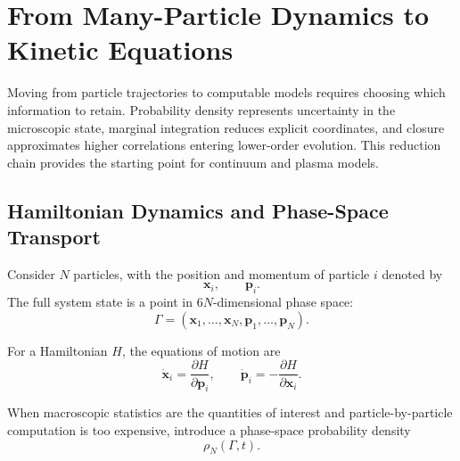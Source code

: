 \chapter{From Many-Particle Dynamics to Kinetic Equations}\label{ch:1}

\begin{chaptersummary}
Moving from particle trajectories to computable models requires choosing which information to retain. Probability density represents uncertainty in the microscopic state, marginal integration reduces explicit coordinates, and closure approximates higher correlations entering lower-order evolution. This reduction chain provides the starting point for continuum and plasma models.
\end{chaptersummary}

\section{Hamiltonian Dynamics and Phase-Space Transport}
Consider \(N\) particles, with the position and momentum of particle \(i\) denoted by
\[
\bm x_i,\qquad \bm p_i.
\]
The full system state is a point in \(6N\)-dimensional phase space:
\[
\Gamma=
(\bm x_1,\dots,\bm x_N,\bm p_1,\dots,\bm p_N).
\]

For a Hamiltonian \(H\), the equations of motion are
\[
\dot{\bm x}_i=\frac{\partial H}{\partial \bm p_i},
\qquad
\dot{\bm p}_i=-\frac{\partial H}{\partial \bm x_i}.
\]

When macroscopic statistics are the quantities of interest and particle-by-particle computation is too expensive, introduce a phase-space probability density
\[
\rho_N(\Gamma,t).
\]

